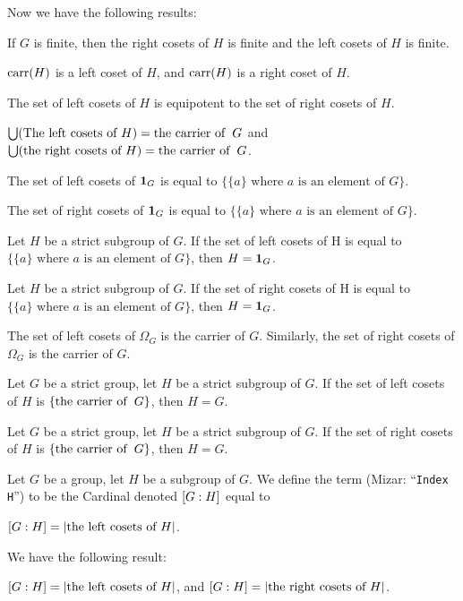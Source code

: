 \documentclass{article}
\begin{document}
Now we have the following results:
\begin{thm}
\item\label{group2:134} If $G$ is finite, then the right cosets of $H$
  is finite and the left cosets of $H$ is finite.
\item\label{group2:135} $\operatorname{carr}(H)$ is a left coset of $H$, and
  $\operatorname{carr}(H)$ is a right coset of $H$.
\item\label{group2:136} The set of left cosets of $H$ is equipotent to
  the set of right cosets of $H$.
\item\label{group2:137} $\bigcup(\mbox{The left cosets of }H)=\operatorname{the\ carrier\ of\ }G$
  and $\bigcup(\mbox{the right cosets of }H)=\operatorname{the\ carrier\ of\ }G$.
\item\label{group2:138} The set of left cosets of $\mathbf{1}_{G}$
  is equal to $\{\{a\} \mbox{ where } a \mbox{ is an element of } G\}$.
\item\label{group2:139} The set of right cosets of $\mathbf{1}_{G}$
  is equal to $\{\{a\} \mbox{ where } a \mbox{ is an element of } G\}$. 
\item\label{group2:140} Let $H$ be a strict subgroup of $G$.
  If the set of left cosets of H
  is equal to $\{\{a\} \mbox{ where } a \mbox{ is an element of } G\}$,
  then $H=\mathbf{1}_{G}$.
\item\label{group2:141} Let $H$ be a strict subgroup of $G$.
  If the set of right cosets of H
  is equal to $\{\{a\} \mbox{ where } a \mbox{ is an element of } G\}$,
  then $H=\mathbf{1}_{G}$.
\item\label{group2:142} The set of left cosets of $\Omega_{G}$ is the
  carrier of $G$. Similarly, the set of right cosets of $\Omega_{G}$ is
  the carrier of $G$.
\item\label{group2:143} Let $G$ be a strict group, let $H$ be a strict
  subgroup of $G$.
  If the set of left cosets of $H$ is $\{\operatorname{the\ carrier\ of\ }G\}$, then $H=G$.
\item\label{group2:144} Let $G$ be a strict group, let $H$ be a strict
  subgroup of $G$.
  If the set of right cosets of $H$ is $\{\operatorname{the\ carrier\ of\ }G\}$, then $H=G$.
\end{thm}

\begin{definition}
Let $G$ be a group, let $H$ be a subgroup of $G$.
We define the term  (Mizar: ``\verb#Index H#'')
to be the Cardinal denoted $[G : H]$ equal to
\begin{defn}
\item $[G : H]=|\mbox{the left cosets of $H$}|$.
\end{defn}
\end{definition}
We have the following result:
\begin{thm}
\item\label{group2:145} $[G : H]=|\mbox{the left cosets of $H$}|$,
  and $[G : H]=|\mbox{the right cosets of $H$}|$.
\end{thm}
\end{document}
